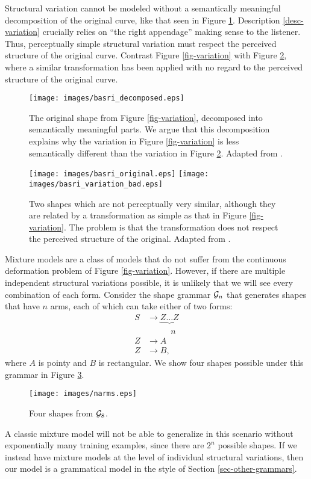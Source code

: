 \documentclass{article}
\begin{document}
Structural variation cannot be modeled without a semantically
meaningful decomposition of the original curve, like that seen in
Figure \ref{fig-variation-decompose}. Description \ref{desc-variation}
crucially relies on ``the right appendage'' making sense to the
listener. Thus, perceptually simple structural variation must respect
the perceived structure of the original curve. Contrast Figure
\ref{fig-variation} with Figure \ref{fig-badvariation}, where a
similar transformation has been applied with no regard to the
perceived structure of the original curve.

\begin{figure}[h]
\centering
\texttt{[image: images/basri\_decomposed.eps]} 
\caption{The original shape from Figure \ref{fig-variation},
  decomposed into semantically meaningful parts. We argue that this
  decomposition explains why the variation in Figure
  \ref{fig-variation} is less semantically different than the
  variation in Figure \ref{fig-badvariation}. Adapted from
  \cite{basri-jacobs}.}
\label{fig-variation-decompose}
\end{figure}

\begin{figure}[h]
\centering
\texttt{[image: images/basri\_original.eps]} 
\texttt{[image: images/basri\_variation\_bad.eps]} 
\caption{Two shapes which are not perceptually very similar, although
  they are related by a transformation as simple as that in Figure
  \ref{fig-variation}. The problem is that the transformation does not
  respect the perceived structure of the original. Adapted from
  \cite{basri-jacobs}.}
\label{fig-badvariation}
\end{figure}

Mixture models are a class of models that do not suffer from the
continuous deformation problem of Figure \ref{fig-variation}. However,
if there are multiple independent structural variations possible, it
is unlikely that we will see every combination of each form.  Consider
the shape grammar ${\mathcal G}_n$ that generates shapes that have $n$ arms,
each of which can take either of two forms:
\begin{align*}
S&\to \underbrace{Z\dots Z}\\
&\phantom{\to Z ..}n\\
Z &\to A\\
Z &\to B,
\end{align*}
where $A$ is pointy and $B$ is rectangular. We show four shapes
possible under this grammar in Figure \ref{fig-narms}. 
\begin{figure}[h]
\centering
\texttt{[image: images/narms.eps]} 
\caption{Four shapes from ${\mathcal G}_8$.}
\label{fig-narms}
\end{figure}
A classic mixture model will not be able to generalize in this
scenario without exponentially many training examples, since there
are $2^n$ possible shapes. If we instead have mixture models at the
level of individual structural variations, then our model is a
grammatical model in the style of Section \ref{sec-other-grammars}.
\end{document}
